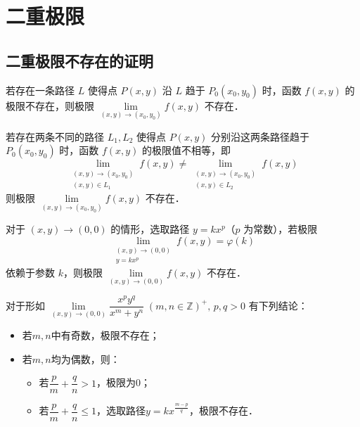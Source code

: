 \documentclass[12pt, a4paper, oneside, UTF8]{ctexbook}
\begin{document}
% 
\else
\fi
\chapter{二重极限}
\section{二重极限不存在的证明}

\begin{theorem}[单路径法]
若存在一条路径 $L$ 使得点 $P(x,y)$ 沿 $L$ 趋于 $P_0(x_0,y_0)$ 时，函数 $f(x,y)$ 的极限不存在，则极限 $\lim\limits_{(x,y) \to (x_0,y_0)} f(x,y)$ 不存在．
\end{theorem}


\begin{theorem}[双路径法]
若存在两条不同的路径 $L_1, L_2$ 使得点 $P(x,y)$ 分别沿这两条路径趋于 $P_0(x_0,y_0)$ 时，函数 $f(x,y)$ 的极限值不相等，即
\[ \lim_{\substack{(x,y) \to (x_0,y_0) \\ (x,y) \in L_1}} f(x,y) \neq \lim_{\substack{(x,y) \to (x_0,y_0) \\ (x,y) \in L_2}} f(x,y) \]
则极限 $\lim\limits_{(x,y) \to (x_0,y_0)} f(x,y)$ 不存在．
\end{theorem}


\begin{theorem}[$y=kx^p$路径法]
对于 $(x,y) \to (0,0)$ 的情形，选取路径 $y=kx^p$（$p$ 为常数），若极限
\[ \lim_{\substack{(x,y) \to (0,0) \\ y=kx^p}} f(x,y) = \varphi(k) \]
依赖于参数 $k$，则极限 $\lim\limits_{(x,y) \to (0,0)} f(x,y)$ 不存在．
\end{theorem}

\begin{corollary}
    对于形如 $\lim\limits_{(x,y) \to (0,0)} \dfrac{x^p y^q}{x^m+y^n}\;(m, n\in \mathbb{Z})^+,\,p,q>0$ 有下列结论：
    \begin{itemize}
        \item 若$m,n$中有奇数，极限不存在；
        \item 若$m,n$均为偶数，则：\begin{itemize}
            \item 若$\dfrac{p}{m}+\dfrac{q}{n}>1$，极限为0；
            \item 若$\dfrac{p}{m}+\dfrac{q}{n}\leq 1$，选取路径$y=kx^{\frac{m-p}{q}}$，极限不存在．
            \end{itemize}
    \end{itemize}
\end{corollary}
\end{document}
